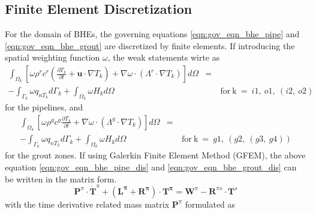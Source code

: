 \subsection{Finite Element Discretization}
For the domain of BHEs, the governing equations \ref{eqn:gov_eqn_bhe_pipe} and \ref{eqn:gov_eqn_bhe_grout} are discretized by finite elements. If introducing the spatial weighting function $\omega$, the weak statements wirte as
\begin{eqnarray}
\label{eqn:gov_eqn_bhe_pipe_dis}
\int_{\Omega_k} \left[ \omega \rho^r c^r \left( \frac{\partial T_k}{\partial t} + \bm{u} \cdot \nabla T_k \right) + \nabla \omega \cdot \left( \Lambda^r \cdot \nabla T_k \right) \right] d\Omega &=&~ \nonumber\\
-\int_{\Gamma_k} \omega q_{nT_k} d\Gamma_k + \int_{\Omega_k} \omega H_k d\Omega &~& \mathrm{~for~k~}=~i1,~o1,~(i2,~o2)
\end{eqnarray}
for the pipelines, and 
\begin{eqnarray}
\label{eqn:gov_eqn_bhe_grout_dis}
\int_{\Omega_k} \left[ \omega \rho^g c^g \frac{\partial T_k}{\partial t} + \nabla \omega \cdot \left( \Lambda^g \cdot \nabla T_k \right) \right] d\Omega &=&~ \nonumber\\
-\int_{\Gamma_k} \omega q_{nT_k} d\Gamma_k + \int_{\Omega_k} \omega H_k d\Omega &~& \mathrm{~for~k~}=~g1,~(g2,~(g3,~g4))
\end{eqnarray}
for the grout zones. If using Galerkin Finite Element Method (GFEM), the above equation \ref{eqn:gov_eqn_bhe_pipe_dis} and \ref{eqn:gov_eqn_bhe_grout_dis} can be written in the matrix form. 
\begin{equation}
\bm{P}^\pi \cdot \bm{\dot{T}}^\pi + ( \bm{L^\pi} + \bm{R^\pi} ) \cdot \bm{T^\pi} = \bm{W}^\pi - \bm{R}^{\pi s} \cdot \bm{T}^{s}
\end{equation}
with the time derivative related mass matrix $\bm{P}^\pi$ formulated as
